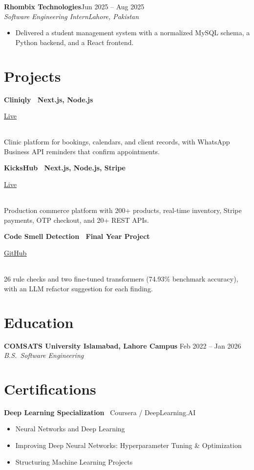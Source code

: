 \documentclass[letterpaper,10pt]{article}
\newcommand{\role}[4]{%
  \vspace{3pt}
  \textbf{#1}\hfill #2\\[1pt]
  \textit{#3}\hfill \textit{#4}\par
  \vspace{1pt}
}
\newcommand{\plink}[2]{\href{#1}{\underline{#2}}}
\newcommand{\project}[3]{%
  \vspace{4pt}%
  \noindent
  \begin{minipage}[t]{0.72\textwidth}
    \RaggedRight\textbf{#1}%
  \end{minipage}\hfill
  \begin{minipage}[t]{0.26\textwidth}
    \raggedleft #2%
  \end{minipage}\\[2pt]
  #3\par
}
\begin{document}
\role{Rhombix Technologies}{Jun 2025 -- Aug 2025}{Software Engineering Intern}{Lahore, Pakistan}
\begin{itemize}
  \item Delivered a student management system with a normalized MySQL schema, a Python backend, and a React frontend.
\end{itemize}

\section{Projects}
\project{Cliniqly \textbar\ Next.js, Node.js}{\plink{https://www.cliniqly.tech/}{Live}}{%
  Clinic platform for bookings, calendars, and client records, with WhatsApp Business API reminders that confirm appointments.%
}
\project{KicksHub \textbar\ Next.js, Node.js, Stripe}{\plink{https://www.kickshub.site/}{Live}}{%
  Production commerce platform with 200+ products, real-time inventory, Stripe payments, OTP checkout, and 20+ REST APIs.%
}
\project{Code Smell Detection \textbar\ Final Year Project}{\plink{https://github.com/https-Haider/FYP-Front-End}{GitHub}}{%
  26 rule checks and two fine-tuned transformers (74.93\% benchmark accuracy), with an LLM refactor suggestion for each finding.%
}

\section{Education}
\textbf{COMSATS University Islamabad, Lahore Campus} \hfill Feb 2022 -- Jan 2026\\
\textit{B.S.\ Software Engineering}

\section{Certifications}
\textbf{Deep Learning Specialization} \textbar\ Coursera / DeepLearning.AI
\begin{itemize}
  \item Neural Networks and Deep Learning
  \item Improving Deep Neural Networks: Hyperparameter Tuning \& Optimization
  \item Structuring Machine Learning Projects
\end{itemize}
\end{document}
